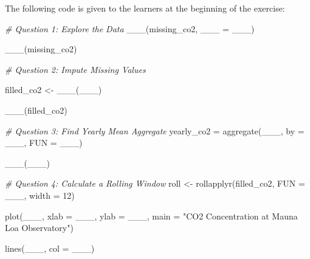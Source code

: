 \documentclass[
]{book}
\newenvironment{Shaded}{\begin{snugshade}}{\end{snugshade}}
\newcommand{\AttributeTok}[1]{\textcolor[rgb]{0.77,0.63,0.00}{#1}}
\newcommand{\CommentTok}[1]{\textcolor[rgb]{0.56,0.35,0.01}{\textit{#1}}}
\newcommand{\DecValTok}[1]{\textcolor[rgb]{0.00,0.00,0.81}{#1}}
\newcommand{\FunctionTok}[1]{\textcolor[rgb]{0.00,0.00,0.00}{#1}}
\newcommand{\NormalTok}[1]{#1}
\newcommand{\OtherTok}[1]{\textcolor[rgb]{0.56,0.35,0.01}{#1}}
\newcommand{\StringTok}[1]{\textcolor[rgb]{0.31,0.60,0.02}{#1}}
\begin{document}
The following code is given to the learners at the beginning of the exercise:

\begin{Shaded}
\begin{Highlighting}[]
\CommentTok{\# Question 1: Explore the Data}
\FunctionTok{\_\_\_}\NormalTok{(missing\_co2, }\AttributeTok{\_\_\_ =}\NormalTok{ \_\_\_)}

\FunctionTok{\_\_\_}\NormalTok{(missing\_co2)}
\end{Highlighting}
\end{Shaded}

\begin{Shaded}
\begin{Highlighting}[]
\CommentTok{\# Question 2: Impute Missing Values}

\NormalTok{filled\_co2 }\OtherTok{\textless{}{-}} \FunctionTok{\_\_\_}\NormalTok{(\_\_\_)}

\FunctionTok{\_\_\_}\NormalTok{(filled\_co2)}
\end{Highlighting}
\end{Shaded}

\begin{Shaded}
\begin{Highlighting}[]
\CommentTok{\# Question 3: Find Yearly Mean Aggregate}
\NormalTok{yearly\_co2 }\OtherTok{=} \FunctionTok{aggregate}\NormalTok{(\_\_\_, }\AttributeTok{by =}\NormalTok{ \_\_\_, }\AttributeTok{FUN =}\NormalTok{ \_\_\_)}

\FunctionTok{\_\_\_}\NormalTok{(\_\_\_)}
\end{Highlighting}
\end{Shaded}

\begin{Shaded}
\begin{Highlighting}[]
\CommentTok{\# Question 4: Calculate a Rolling Window}
\NormalTok{roll }\OtherTok{\textless{}{-}} \FunctionTok{rollapplyr}\NormalTok{(filled\_co2, }\AttributeTok{FUN =}\NormalTok{ \_\_\_, }\AttributeTok{width =} \DecValTok{12}\NormalTok{)}

\FunctionTok{plot}\NormalTok{(\_\_\_,}
     \AttributeTok{xlab =}\NormalTok{ \_\_\_,}
     \AttributeTok{ylab =}\NormalTok{ \_\_\_,}
     \AttributeTok{main =} \StringTok{"CO2 Concentration at Mauna Loa Observatory"}\NormalTok{)}

\FunctionTok{lines}\NormalTok{(\_\_\_, }\AttributeTok{col =}\NormalTok{ \_\_\_)}
\end{Highlighting}
\end{Shaded}


  
\end{document}

